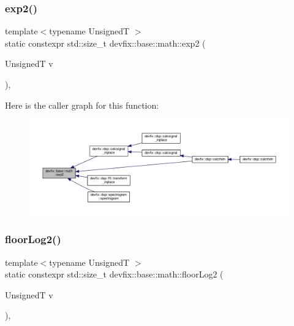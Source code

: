 \subsubsection{\texorpdfstring{exp2()}{exp2()}}
{\footnotesize\ttfamily template$<$typename UnsignedT $>$ \\
static constexpr std\+::size\+\_\+t devfix\+::base\+::math\+::exp2 (\begin{DoxyParamCaption}\item[{UnsignedT}]{v }\end{DoxyParamCaption})\hspace{0.3cm}{\ttfamily [inline]}, {\ttfamily [static]}}

Here is the caller graph for this function\+:
\nopagebreak
\begin{figure}[H]
\begin{center}
\leavevmode
\includegraphics[width=350pt]{structdevfix_1_1base_1_1math_a4aa317a84af4eb10be4474c90cb47afe_icgraph}
\end{center}
\end{figure}
\mbox{\label{structdevfix_1_1base_1_1math_a3ea732698f7ebf65df433de95721a6c1}} 
\subsubsection{\texorpdfstring{floor\+Log2()}{floorLog2()}}
{\footnotesize\ttfamily template$<$typename UnsignedT $>$ \\
static constexpr std\+::size\+\_\+t devfix\+::base\+::math\+::floor\+Log2 (\begin{DoxyParamCaption}\item[{UnsignedT}]{v }\end{DoxyParamCaption})\hspace{0.3cm}{\ttfamily [inline]}, {\ttfamily [static]}}


